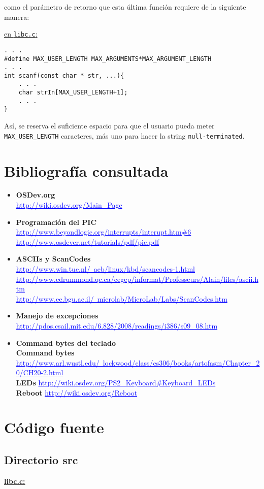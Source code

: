 \documentclass[a4paper,10pt]{article}
\begin{document}
como el parámetro de retorno que esta última función  requiere de la siguiente manera:\par \noindent \newline
\underline{en \texttt{libc.c}:}
\begin{verbatim}
. . .
#define MAX_USER_LENGTH MAX_ARGUMENTS*MAX_ARGUMENT_LENGTH
. . .
int scanf(const char * str, ...){
    . . .
    char strIn[MAX_USER_LENGTH+1];
    . . .
}
\end{verbatim}
\par Así, se reserva el suficiente espacio para que el usuario pueda meter \texttt{MAX\_USER\_LENGTH} caracteres, más uno para hacer
la string \texttt{null-terminated}.\par \noindent \newline
\clearpage
\section{Bibliografía consultada}
\begin{itemize}
\item \textbf{OSDev.org}\\
\textcolor{blue}{\underline{http://wiki.osdev.org/Main\_Page}}\\
\item \textbf{Programación del PIC}\\
\textbf{} \textcolor{blue}{\underline{http://www.beyondlogic.org/interrupts/interupt.htm\#6}}\\
\textbf{} \textcolor{blue}{\underline{http://www.osdever.net/tutorials/pdf/pic.pdf}}\\
\item \textbf{ASCIIs y ScanCodes}\\
\textbf{} \textcolor{blue}{\underline{http://www.win.tue.nl/~aeb/linux/kbd/scancodes-1.html}}\\
\textbf{} \textcolor{blue}{\underline{http://www.cdrummond.qc.ca/cegep/informat/Professeurs/Alain/files/ascii.htm}}\\
\textbf{} \textcolor{blue}{\underline{http://www.ee.bgu.ac.il/~microlab/MicroLab/Labs/ScanCodes.htm}}\\
\item \textbf{Manejo de excepciones}\\
\textbf{} \textcolor{blue}{\underline{http://pdos.csail.mit.edu/6.828/2008/readings/i386/s09\_08.htm}}\\
\item \textbf{Command bytes del teclado}\\
\textbf{Command bytes}\\
\textcolor{blue}{\underline{http://www.arl.wustl.edu/~lockwood/class/cs306/books/artofasm/Chapter\_20/CH20-2.html}}\\
\textbf{LEDs} \textcolor{blue}{\underline{http://wiki.osdev.org/PS2\_Keyboard\#Keyboard\_LEDs}}\\
\textbf{Reboot} \textcolor{blue}{\underline{http://wiki.osdev.org/Reboot}}\\
\end{itemize}
\clearpage

\section{Código fuente}
\subsection{Directorio src}
\large{\underline{\textbf{libc.c:}}}\\
\end{document}
